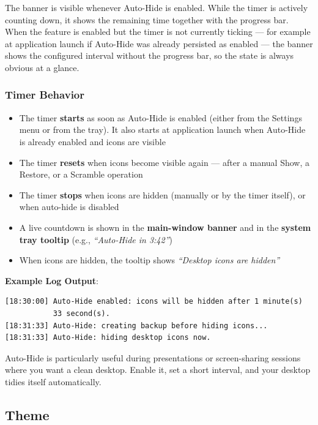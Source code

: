 \documentclass[a4paper,11pt]{article}
\begin{document}
The banner is visible whenever Auto-Hide is enabled. While the timer is
actively counting down, it shows the remaining time together with the
progress bar. When the feature is enabled but the timer is not currently
ticking --- for example at application launch if Auto-Hide was already
persisted as enabled --- the banner shows the configured interval
without the progress bar, so the state is always obvious at a glance.

\subsubsection{Timer Behavior}

\begin{itemize}
  \item The timer \textbf{starts} as soon as Auto-Hide is enabled
    (either from the Settings menu or from the tray). It also starts
    at application launch when Auto-Hide is already enabled and icons
    are visible
  \item The timer \textbf{resets} when icons become visible again ---
    after a manual Show, a Restore, or a Scramble operation
  \item The timer \textbf{stops} when icons are hidden (manually or by
    the timer itself), or when auto-hide is disabled
  \item A live countdown is shown in the \textbf{main-window banner}
    and in the \textbf{system tray tooltip}
    (e.g., \textit{``Auto-Hide in 3:42''})
  \item When icons are hidden, the tooltip shows
    \textit{``Desktop icons are hidden''}
\end{itemize}

\textbf{Example Log Output}:
\begin{verbatim}
[18:30:00] Auto-Hide enabled: icons will be hidden after 1 minute(s)
           33 second(s).
[18:31:33] Auto-Hide: creating backup before hiding icons...
[18:31:33] Auto-Hide: hiding desktop icons now.
\end{verbatim}

\begin{infobox}[Tip]
  Auto-Hide is particularly useful during presentations or screen-sharing
  sessions where you want a clean desktop. Enable it, set a short
  interval, and your desktop tidies itself automatically.
\end{infobox}

\subsection{Theme}
\end{document}
